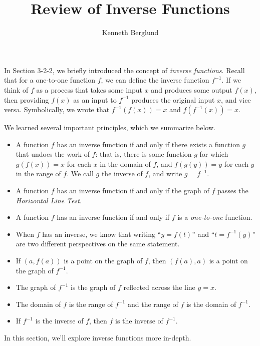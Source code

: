 \documentclass[nooutcomes]{ximera}
\author{Kenneth Berglund}
\title{Review of Inverse Functions}
\begin{document}
\begin{abstract}
  
\end{abstract}
\maketitle





In Section 3-2-2, we briefly introduced the concept of \emph{inverse functions}. Recall that for a one-to-one function $f$, we can define the inverse function $f^{-1}$. If we think of $f$ as a process that takes some input $x$ and produces some output $f(x)$, then providing $f(x)$ as an input to $f^{-1}$ produces the original input $x$, and vice versa. Symbolically, we wrote that $f^{-1}(f(x)) = x$ and $f(f^{-1}(x)) = x$. 

We learned several important principles, which we summarize below.
\begin{itemize}
\item
A function $f$ has an inverse function if and only if there exists a function $g$ that undoes the work of $f$: that is, there is some function $g$ for which $g(f(x)) = x$ for each $x$ in the domain of $f$, and $f(g(y)) = y$ for each $y$ in the range of $f$. We call $g$ the inverse of $f$, and write $g = f^{-1}$.%
\item
A function $f$ has an inverse function if and only if the graph of $f$ passes the {\it Horizontal Line Test}.
\item
A function $f$ has an inverse function if and only if $f$ is a {\it one-to-one} function.
\item
When $f$ has an inverse, we know that writing ``$y = f(t)$'' and ``$t = f^{-1}(y)$''  are two different perspectives on the same statement.
\item If $(a, f(a))$ is a point on the graph of $f$, then $(f(a), a)$ is a point on the graph of $f^{-1}$. 
\item The graph of $f^{-1}$ is the graph of $f$ reflected across the line $y = x$.
\item The domain of $f$ is the range of $f^{-1}$ and the range of $f$ is the domain of $f^{-1}$.
\item If $f^{-1}$ is the inverse of $f$, then $f$ is the inverse of $f^{-1}$.

\end{itemize}

In this section, we'll explore inverse functions more in-depth.
\end{document}
